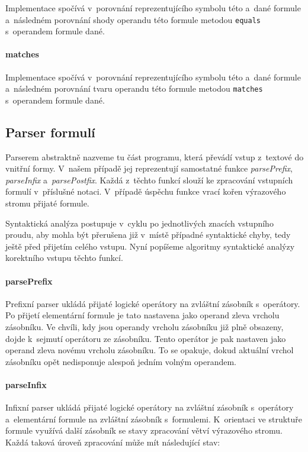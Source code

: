 \documentclass[thesis=B,czech,hidelinks]{thesis}[2012/06/26]
\begin{document}
Implementace spočívá v~porovnání reprezentujícího symbolu této a~dané formule a~následném porovnání shody operandu této formule metodou \texttt{equals} s~operandem formule dané.

\paragraph{matches}

Implementace spočívá v~porovnání reprezentujícího symbolu této a~dané formule a~následném porovnání tvaru operandu této formule metodou \texttt{matches} s~operandem formule dané.

\subsection{Parser formulí}

Parserem abstraktně nazveme tu část programu, která převádí vstup z~textové do vnitřní formy. V~našem případě jej reprezentují samostatné funkce \emph{parsePrefix}, \emph{parseInfix} a~\emph{parsePostfix}. Každá z~těchto funkcí slouží ke zpracování vstupních formulí v~příslušné notaci. V~případě úspěchu funkce vrací kořen výrazového stromu přijaté formule.

Syntaktická analýza postupuje v~cyklu po jednotlivých znacích vstupního proudu, aby mohla být přerušena již v~místě případné syntaktické chyby, tedy ještě před přijetím celého vstupu. Nyní popíšeme algoritmy syntaktické analýzy korektního vstupu těchto funkcí.

\paragraph{parsePrefix}

Prefixní parser ukládá přijaté logické operátory na zvláštní zásobník s~operátory. Po přijetí elementární formule je tato nastavena jako operand zleva vrcholu zásobníku. Ve chvíli, kdy jsou operandy vrcholu zásobníku již plně obsazeny, dojde k~sejmutí operátoru ze zásobníku. Tento operátor je pak nastaven jako operand zleva novému vrcholu zásobníku. To se opakuje, dokud aktuální vrchol zásobníku opět nedisponuje alespoň jedním volným operandem.

\paragraph{parseInfix}

Infixní parser ukládá přijaté logické operátory na zvláštní zásobník s~operátory a~elementární formule na zvláštní zásobník s~formulemi. K~orientaci ve struktuře formule využívá další zásobník se stavy zpracování větví výrazového stromu. Každá taková úroveň zpracování může mít následující stav:
\end{document}
